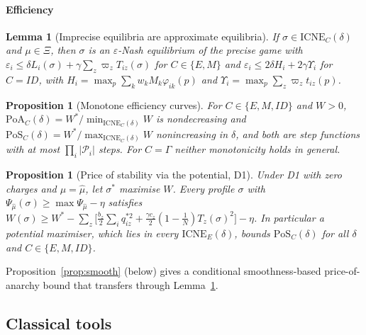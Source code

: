 \documentclass[preprint,12pt]{elsarticle}
\newtheorem{lemma}[theorem]{Lemma}
\newtheorem{proposition}[theorem]{Proposition}
\theoremstyle{definition}
\theoremstyle{remark}
\newcommand{\cP}{\mathcal{P}}
\newcommand{\ICNE}{\mathrm{ICNE}}
\begin{document}
\paragraph{Efficiency}

\begin{lemma}[Imprecise equilibria are approximate equilibria]\label{lem:transfer}
If $\sigma\in\ICNE_C(\delta)$ and $\mu\in\Xi$, then $\sigma$ is an $\varepsilon$-Nash equilibrium of the precise game with $\varepsilon_i\le\delta L_i(\sigma)+\gamma\sum_z\varpi_zT_{iz}(\sigma)$ for $C\in\{E,M\}$ and $\varepsilon_i\le2\delta H_i+2\gamma\Upsilon_i$ for $C=ID$, with $H_i=\max_p\sum_kw_kM_k\varphi_{ik}(p)$ and $\Upsilon_i=\max_p\sum_z\varpi_zt_{iz}(p)$.
\end{lemma}

\begin{proposition}[Monotone efficiency curves]\label{prop:cs}
For $C\in\{E,M,ID\}$ and $W>0$, $\mathrm{PoA}_C(\delta)=W^*/\min_{\ICNE_C(\delta)}W$ is nondecreasing and $\mathrm{PoS}_C(\delta)=W^*/\max_{\ICNE_C(\delta)}W$ nonincreasing in $\delta$, and both are step functions with at most $\prod_i|\cP_i|$ steps. For $C=\Gamma$ neither monotonicity holds in general.
\end{proposition}

\begin{proposition}[Price of stability via the potential, D1]\label{prop:pos}
Under D1 with zero charges and $\mu=\hat\mu$, let $\sigma^*$ maximise $W$. Every profile $\sigma$ with $\Psi_{\hat\mu}(\sigma)\ge\max\Psi_{\hat\mu}-\eta$ satisfies
$W(\sigma)\ge W^*-\sum_z\big[\tfrac{b_z}{2}\sum_iq_{iz}^{*2}+\tfrac{\gamma c_z}{2}(1-\tfrac1N)T_z(\sigma)^2\big]-\eta$. In particular a potential maximiser, which lies in every $\ICNE_E(\delta)$, bounds $\mathrm{PoS}_C(\delta)$ for all $\delta$ and $C\in\{E,M,ID\}$.
\end{proposition}

Proposition~\ref{prop:smooth} (below) gives a conditional smoothness-based price-of-anarchy bound that transfers through Lemma~\ref{lem:transfer}.


\subsection{Classical tools}
\end{document}
